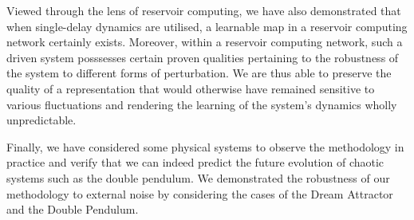 Viewed through the lens of reservoir computing, we have also demonstrated that when single-delay dynamics are utilised, a learnable map in a reservoir computing network certainly exists. 
Moreover, within a reservoir computing network, such a driven system posssesses certain proven qualities pertaining to the robustness of the system to different forms of perturbation. 
We are thus able to preserve the quality of a representation that would otherwise have remained sensitive to various fluctuations and rendering the learning of the system’s dynamics wholly unpredictable. 


Finally, we have considered some physical systems to observe the methodology in practice and verify that we can indeed predict the future evolution of chaotic systems such as the double pendulum.
We demonstrated the robustness of our methodology to external noise by considering the cases of the  Dream Attractor and the Double Pendulum.

